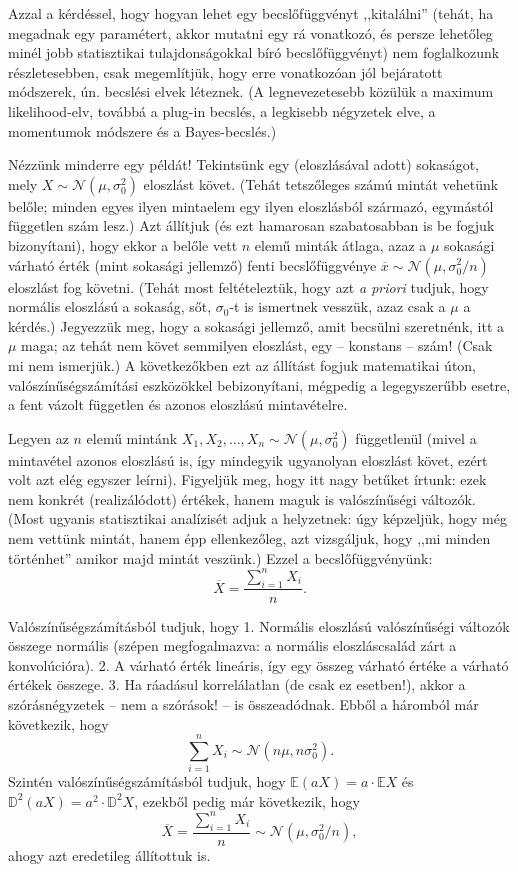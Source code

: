 \documentclass[]{book}
\begin{document}
Azzal a kérdéssel, hogy hogyan lehet egy becslőfüggvényt ,,kitalálni''
(tehát, ha megadnak egy paramétert, akkor mutatni egy rá vonatkozó, és
persze lehetőleg minél jobb statisztikai tulajdonságokkal bíró
becslőfüggvényt) nem foglalkozunk részletesebben, csak megemlítjük, hogy
erre vonatkozóan jól bejáratott módszerek, ún. becslési elvek léteznek.
(A legnevezetesebb közülük a maximum likelihood-elv, továbbá a plug-in
becslés, a legkisebb négyzetek elve, a momentumok módszere és a
Bayes-becslés.)

Nézzünk minderre egy példát! Tekintsünk egy (eloszlásával adott)
sokaságot, mely \(X\sim\mathcal{N}\left(\mu,\sigma_0^2\right)\)
eloszlást követ. (Tehát tetszőleges számú mintát vehetünk belőle; minden
egyes ilyen mintaelem egy ilyen eloszlásból származó, egymástól
független szám lesz.) Azt állítjuk (és ezt hamarosan szabatosabban is be
fogjuk bizonyítani), hogy ekkor a belőle vett \(n\) elemű minták átlaga,
azaz a \(\mu\) sokasági várható érték (mint sokasági jellemző) fenti
becslőfüggvénye
\(\overline{x}\sim\mathcal{N}\left(\mu,\sigma_0^2/n\right)\) eloszlást
fog követni. (Tehát most feltételeztük, hogy azt \emph{a priori} tudjuk,
hogy normális eloszlású a sokaság, sőt, \(\sigma_0\)-t is ismertnek
vesszük, azaz csak a \(\mu\) a kérdés.) Jegyezzük meg, hogy a sokasági
jellemző, amit becsülni szeretnénk, itt a \(\mu\) maga; az tehát nem
követ semmilyen eloszlást, egy -- konstans -- szám! (Csak mi nem
ismerjük.) A következőkben ezt az állítást fogjuk matematikai úton,
valószínűségszámítási eszközökkel bebizonyítani, mégpedig a
legegyszerűbb esetre, a fent vázolt független és azonos eloszlású
mintavételre.

Legyen az \(n\) elemű mintánk
\(X_1,X_2,\ldots,X_n\sim\mathcal{N}\left(\mu,\sigma_0^2\right)\)
függetlenül (mivel a mintavétel azonos eloszlású is, így mindegyik
ugyanolyan eloszlást követ, ezért volt azt elég egyszer leírni).
Figyeljük meg, hogy itt nagy betűket írtunk: ezek nem konkrét
(realizálódott) értékek, hanem maguk is valószínűségi változók. (Most
ugyanis statisztikai analízisét adjuk a helyzetnek: úgy képzeljük, hogy
még nem vettünk mintát, hanem épp ellenkezőleg, azt vizsgáljuk, hogy
,,mi minden történhet'' amikor majd mintát veszünk.) Ezzel a
becslőfüggvényünk: \[
    \overline{X}=\frac{\sum_{i=1}^n X_i}{n}.
\]

Valószínűségszámításból tudjuk, hogy 1. Normális eloszlású valószínűségi
változók összege normális (szépen megfogalmazva: a normális
eloszláscsalád zárt a konvolúcióra). 2. A várható érték lineáris, így
egy összeg várható értéke a várható értékek összege. 3. Ha ráadásul
korrelálatlan (de csak ez esetben!), akkor a szórásnégyzetek -- nem a
szórások! -- is összeadódnak. Ebből a háromból már következik, hogy \[
    \sum_{i=1}^n X_i\sim\mathcal{N}\left(n\mu,n\sigma_0^2\right).
\] Szintén valószínűségszámításból tudjuk, hogy
\(\mathbb{E}\left(aX\right)=a \cdot \mathbb{E}X\) és
\(\mathbb{D}^2\left(aX\right)=a^2 \cdot \mathbb{D}^2 X\), ezekből pedig
már következik, hogy \[
    \overline{X}=\frac{\sum_{i=1}^n X_i}{n} \sim \mathcal{N}\left(\mu,\sigma_0^2/n\right),
\] ahogy azt eredetileg állítottuk is.
\end{document}
